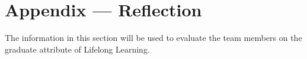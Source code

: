 \documentclass[12pt, titlepage]{article}
\begin{document}





\newpage{}
\section*{Appendix --- Reflection}


The information in this section will be used to evaluate the team members on the
graduate attribute of Lifelong Learning.


\end{document}
